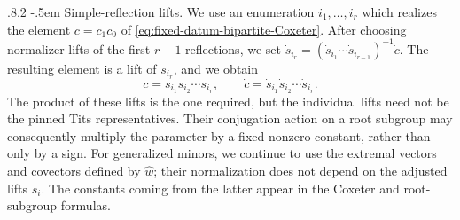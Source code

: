 \documentclass[11pt,leqno]{amsart}
\makeatletter
\numberwithin{equation}{section}
\renewcommand\paragraph{\@startsection{paragraph}{4}{\z@}%
  {.8\baselineskip \@plus .2\baselineskip}%
  {-.5em}%
  {\normalfont\normalsize\bfseries}}
\theoremstyle{plain}
\theoremstyle{definition}
\theoremstyle{plain}
\theoremstyle{definition}
\theoremstyle{remark}
\makeatother
\begin{document}
\paragraph{Simple-reflection lifts.}
We use an enumeration $i_1,\ldots,i_r$ which realizes the element $c=c_1c_0$ of \eqref{eq:fixed-datum-bipartite-Coxeter}.  After choosing normalizer lifts of the first $r-1$ reflections, we set $\dot s_{i_r}=(\dot s_{i_1}\cdots\dot s_{i_{r-1}})^{-1}\dot c$.  The resulting element is a lift of $s_{i_r}$, and we obtain
\begin{equation}\label{eq:coxeter}
 c=s_{i_1}s_{i_2}\cdots s_{i_r},
 \qquad
 \dot c=\dot s_{i_1}\dot s_{i_2}\cdots\dot s_{i_r}.
\end{equation}
The product of these lifts is the one required, but the individual lifts need not be the pinned Tits representatives.  Their conjugation action on a root subgroup may consequently multiply the parameter by a fixed nonzero constant, rather than only by a sign.  For generalized minors, we continue to use the extremal vectors and covectors defined by $\widehat w$; their normalization does not depend on the adjusted lifts $\dot s_i$.  The constants coming from the latter appear in the Coxeter and root-subgroup formulas.
\end{document}
